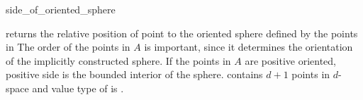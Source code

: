 \begin{ccRefFunction}{side_of_oriented_sphere}

{ returns the relative position of point  to the oriented
  sphere defined by the points in \ccc{A = tuple [first,last)} The
  order of the points in $A$ is important, since it determines the
  orientation of the implicitly constructed sphere.  If the points in
  $A$ are positive oriented, positive side is the bounded interior of
  the sphere.  
  \ccPrecond {} contains $d+1$ points in $d$-space and
  value type of  is .}

\end{ccRefFunction}


